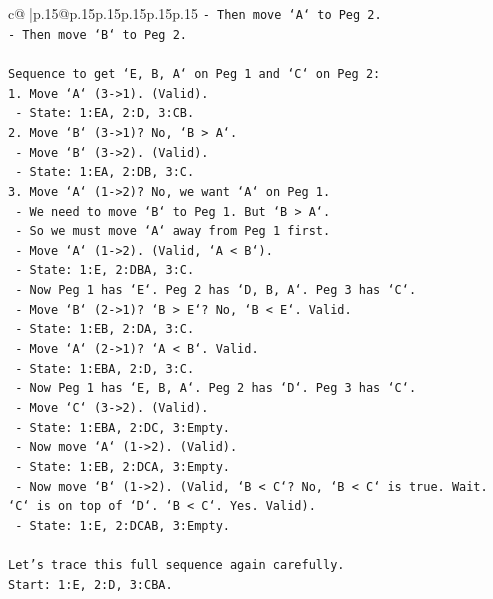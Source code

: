 \documentclass{article}
\begin{document}
{\begin{supertabular}{c@{$\;$}|p{.15\linewidth}@{}p{.15\linewidth}p{.15\linewidth}p{.15\linewidth}p{.15\linewidth}p{.15\linewidth}}
{{{\texttt{{-} Then move `A` to Peg 2.} \\
\texttt{{-} Then move `B` to Peg 2.} \\
\\ 
\texttt{Sequence to get `E, B, A` on Peg 1 and `C` on Peg 2:} \\
\texttt{1. Move `A` (3{-}>1). (Valid).} \\
\texttt{   {-} State: 1:EA, 2:D, 3:CB.} \\
\texttt{2. Move `B` (3{-}>1)? No, `B > A`.} \\
\texttt{   {-} Move `B` (3{-}>2). (Valid).} \\
\texttt{   {-} State: 1:EA, 2:DB, 3:C.} \\
\texttt{3. Move `A` (1{-}>2)? No, we want `A` on Peg 1.} \\
\texttt{   {-} We need to move `B` to Peg 1. But `B > A`.} \\
\texttt{   {-} So we must move `A` away from Peg 1 first.} \\
\texttt{   {-} Move `A` (1{-}>2). (Valid, `A < B`).} \\
\texttt{   {-} State: 1:E, 2:DBA, 3:C.} \\
\texttt{   {-} Now Peg 1 has `E`. Peg 2 has `D, B, A`. Peg 3 has `C`.} \\
\texttt{   {-} Move `B` (2{-}>1)? `B > E`? No, `B < E`. Valid.} \\
\texttt{   {-} State: 1:EB, 2:DA, 3:C.} \\
\texttt{   {-} Move `A` (2{-}>1)? `A < B`. Valid.} \\
\texttt{   {-} State: 1:EBA, 2:D, 3:C.} \\
\texttt{   {-} Now Peg 1 has `E, B, A`. Peg 2 has `D`. Peg 3 has `C`.} \\
\texttt{   {-} Move `C` (3{-}>2). (Valid).} \\
\texttt{   {-} State: 1:EBA, 2:DC, 3:Empty.} \\
\texttt{   {-} Now move `A` (1{-}>2). (Valid).} \\
\texttt{   {-} State: 1:EB, 2:DCA, 3:Empty.} \\
\texttt{   {-} Now move `B` (1{-}>2). (Valid, `B < C`? No, `B < C` is true. Wait. `C` is on top of `D`. `B < C`. Yes. Valid).} \\
\texttt{   {-} State: 1:E, 2:DCAB, 3:Empty.} \\
\\ 
\texttt{Let's trace this full sequence again carefully.} \\
\texttt{Start: 1:E, 2:D, 3:CBA.} \\
}}}
\end{supertabular}}
\end{document}
